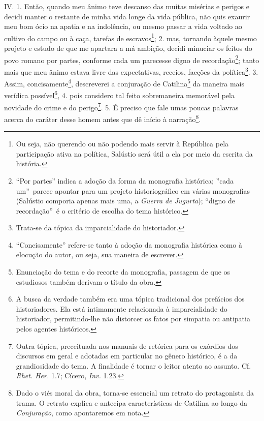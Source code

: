IV. 1. Então, quando meu ânimo teve descanso das muitas misérias e perigos e
decidi manter o restante de minha vida longe da vida pública, não quis exaurir
meu bom ócio na apatia e na indolência, ou mesmo passar a vida voltado ao
cultivo do campo ou à caça, tarefas de escravos\footnote{Ou seja, não querendo
ou não podendo mais servir à República pela participação ativa na política,
Salústio será útil a ela por meio da escrita da história.}; 2. mas, tornando
àquele mesmo projeto e estudo de que me apartara a má ambição, decidi minuciar
os feitos do povo romano por partes, conforme cada um parecesse digno de
recordação\footnote{``Por partes'' indica a adoção da forma da monografia
histórica; ''cada um''\ parece apontar para um projeto historiográfico em
várias monografias (Salústio comporia apenas mais uma, a \emph{Guerra de
Jugurta}); ``digno de recordação''\ é o critério de escolha do tema
histórico.}; tanto mais que meu ânimo estava livre das expectativas, receios,
facções da política\footnote{Trata-se da tópica da imparcialidade do
historiador.}. 3. Assim, concisamente\footnote{``Concisamente'' refere-se tanto
à adoção da monografia histórica como à elocução do autor, ou seja, sua maneira
de escrever.}, descreverei a conjuração de Catilina\footnote{Enunciação do tema
e do recorte da monografia, passagem de que os estudiosos também derivam o
título da obra.} da maneira mais verídica possível\footnote{A busca da verdade
também era uma tópica tradicional dos prefácios dos
historiadores. Ela está intimamente relacionada à imparcialidade do
historiador, permitindo-lhe não distorcer os fatos por simpatia ou antipatia
pelos agentes históricos.}, 4. pois considero tal feito sobremaneira memorável
pela novidade do crime e do perigo\footnote{Outra tópica, preceituada nos
manuais de retórica para os exórdios dos discursos em geral e adotadas em
particular no gênero histórico, é a da grandiosidade do tema. A finalidade é
tornar o leitor atento ao assunto. Cf. \emph{Rhet. Her.} 1.7; Cícero, \emph{Inv.} 1.23.}. 5. É preciso que fale umas poucas
palavras acerca do caráter desse homem antes que dê início à
narração\footnote{Dado o viés moral da obra, torna-se essencial um retrato do
protagonista da trama. O retrato explica e antecipa características de Catilina
ao longo da \emph{Conjuração}, como apontaremos em nota.}.

